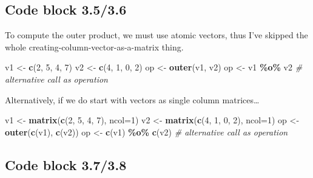 \documentclass[
]{book}
\newenvironment{Shaded}{\begin{snugshade}}{\end{snugshade}}
\newcommand{\CommentTok}[1]{\textcolor[rgb]{0.56,0.35,0.01}{\textit{#1}}}
\newcommand{\DataTypeTok}[1]{\textcolor[rgb]{0.13,0.29,0.53}{#1}}
\newcommand{\DecValTok}[1]{\textcolor[rgb]{0.00,0.00,0.81}{#1}}
\newcommand{\KeywordTok}[1]{\textcolor[rgb]{0.13,0.29,0.53}{\textbf{#1}}}
\newcommand{\NormalTok}[1]{#1}
\newcommand{\OperatorTok}[1]{\textcolor[rgb]{0.81,0.36,0.00}{\textbf{#1}}}
\newcommand{\StringTok}[1]{\textcolor[rgb]{0.31,0.60,0.02}{#1}}
\begin{document}
\hypertarget{code-block-3.53.6}{%
\subsection*{Code block 3.5/3.6}\label{code-block-3.53.6}}

To compute the outer product, we must use atomic vectors, thus I've skipped the whole creating-column-vector-as-a-matrix thing.

\begin{Shaded}
\begin{Highlighting}[]
\NormalTok{v1 \textless{}{-}}\StringTok{ }\KeywordTok{c}\NormalTok{(}\DecValTok{2}\NormalTok{, }\DecValTok{5}\NormalTok{, }\DecValTok{4}\NormalTok{, }\DecValTok{7}\NormalTok{)}
\NormalTok{v2 \textless{}{-}}\StringTok{ }\KeywordTok{c}\NormalTok{(}\DecValTok{4}\NormalTok{, }\DecValTok{1}\NormalTok{, }\DecValTok{0}\NormalTok{, }\DecValTok{2}\NormalTok{)}
\NormalTok{op \textless{}{-}}\StringTok{ }\KeywordTok{outer}\NormalTok{(v1, v2)}
\NormalTok{op \textless{}{-}}\StringTok{ }\NormalTok{v1 }\OperatorTok{\%o\%}\StringTok{ }\NormalTok{v2 }\CommentTok{\# alternative call as operation}
\end{Highlighting}
\end{Shaded}

Alternatively, if we do start with vectors as single column matrices\ldots{}

\begin{Shaded}
\begin{Highlighting}[]
\NormalTok{v1 \textless{}{-}}\StringTok{ }\KeywordTok{matrix}\NormalTok{(}\KeywordTok{c}\NormalTok{(}\DecValTok{2}\NormalTok{, }\DecValTok{5}\NormalTok{, }\DecValTok{4}\NormalTok{, }\DecValTok{7}\NormalTok{), }\DataTypeTok{ncol=}\DecValTok{1}\NormalTok{)}
\NormalTok{v2 \textless{}{-}}\StringTok{ }\KeywordTok{matrix}\NormalTok{(}\KeywordTok{c}\NormalTok{(}\DecValTok{4}\NormalTok{, }\DecValTok{1}\NormalTok{, }\DecValTok{0}\NormalTok{, }\DecValTok{2}\NormalTok{), }\DataTypeTok{ncol=}\DecValTok{1}\NormalTok{)}
\NormalTok{op \textless{}{-}}\StringTok{ }\KeywordTok{outer}\NormalTok{(}\KeywordTok{c}\NormalTok{(v1), }\KeywordTok{c}\NormalTok{(v2))}
\NormalTok{op \textless{}{-}}\StringTok{ }\KeywordTok{c}\NormalTok{(v1) }\OperatorTok{\%o\%}\StringTok{ }\KeywordTok{c}\NormalTok{(v2) }\CommentTok{\# alternative call as operation}
\end{Highlighting}
\end{Shaded}

\hypertarget{code-block-3.73.8}{%
\subsection*{Code block 3.7/3.8}\label{code-block-3.73.8}}
\end{document}
